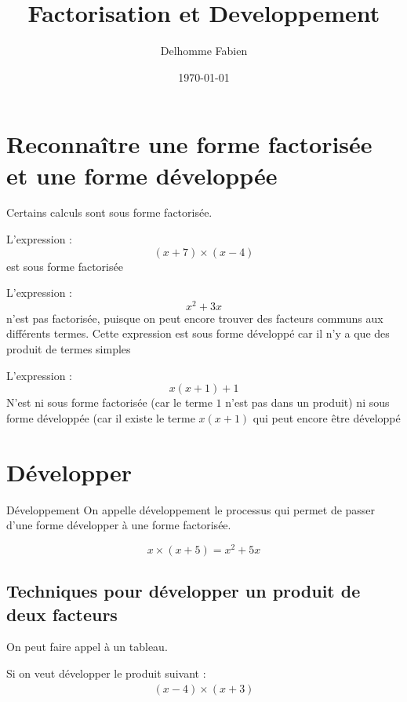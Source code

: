\documentclass[11pt]{article}
\author{Delhomme Fabien}
\date{\today}
\title{Factorisation et Developpement}
\begin{document}
\maketitle


\section{Reconnaître une forme factorisée et une forme développée}
\label{sec:org108fd94}

Certains calculs sont sous forme factorisée.

\begin{ex}
L'expression :
\[
(x+7)\times (x - 4)
\]
est sous forme factorisée
\end{ex}

\begin{ex}
    L'expression :
    \[
        x^{2} + 3x
    \]
    n'est pas factorisée, puisque on peut encore trouver des facteurs communs aux différents termes. Cette expression est sous forme développé car il n'y a que des produit de termes simples
\end{ex}

\begin{ex}
   L'expression :
\[
x(x+1) + 1
\]
N'est ni sous forme factorisée (car le terme $1$ n'est pas dans un produit) ni sous forme développée (car il existe le terme $x(x+1)$ qui peut encore être développé
\end{ex}


\section{Développer}
\label{sec:org08c440c}

 \begin{defi}{Développement}
On appelle développement le processus qui permet de passer d'une forme développer à une forme factorisée.
 \end{defi}

\begin{ex}
    \[
        x \times (x + 5) = x^{2} + 5x
    \]
 \end{ex}

\subsection{Techniques pour développer un produit de deux facteurs}
\label{sec:orgc233821}

On peut faire appel à un tableau.

Si on veut développer le produit suivant :
\begin{align*}
(x-4)\times (x + 3)
\end{align*}
\end{document}
